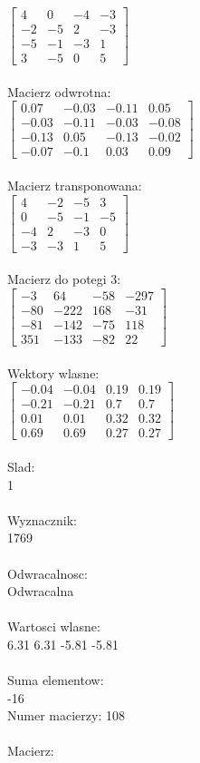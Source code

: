 \documentclass[a4paper,12pt]{article}
\begin{document}
$\begin{bmatrix} 4&0&-4&-3\\-2&-5&2&-3\\-5&-1&-3&1\\3&-5&0&5 \end{bmatrix}$
\\
\\
Macierz odwrotna:\\

$\begin{bmatrix} 0.07&-0.03&-0.11&0.05\\-0.03&-0.11&-0.03&-0.08\\-0.13&0.05&-0.13&-0.02\\-0.07&-0.1&0.03&0.09 \end{bmatrix}$
\\
\\
Macierz transponowana:\\

$\begin{bmatrix} 4&-2&-5&3\\0&-5&-1&-5\\-4&2&-3&0\\-3&-3&1&5 \end{bmatrix}$
\\
\\
Macierz do potegi 3:\\

$\begin{bmatrix} -3&64&-58&-297\\-80&-222&168&-31\\-81&-142&-75&118\\351&-133&-82&22 \end{bmatrix}$
\\
\\
Wektory wlasne:\\

$\begin{bmatrix} -0.04&-0.04&0.19&0.19\\-0.21&-0.21&0.7&0.7\\0.01&0.01&0.32&0.32\\0.69&0.69&0.27&0.27 \end{bmatrix}$
\\
\\
Slad:\\
1
\\
\\
Wyznacznik:\\
1769
\\
\\
Odwracalnosc:\\
Odwracalna
\\
\\
Wartosci wlasne:\\
6.31 6.31 -5.81 -5.81
\\
\\
Suma elementow:\\
-16
\\
\newpage
Numer macierzy:
108
\\
\\
Macierz:\\
\end{document}
